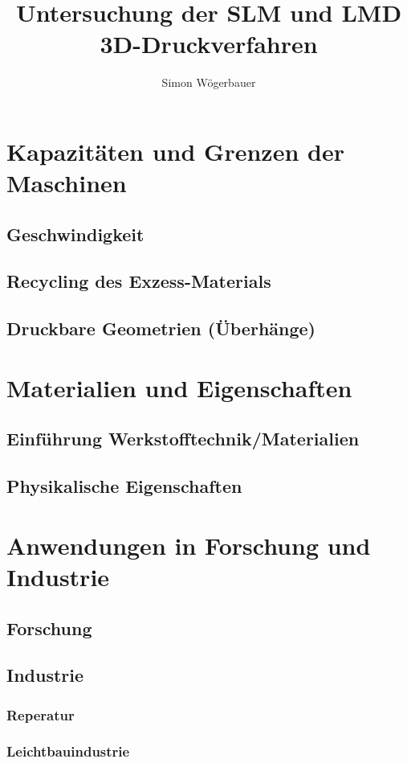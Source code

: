 \documentclass[12pt]{article}
\title{Untersuchung der SLM und LMD 3D-Druckverfahren}
\author{Simon Wögerbauer}
\begin{document}

%
\pagebreak
\pagebreak
{}
\tableofcontents
\pagebreak



\section{Kapazitäten und Grenzen der Maschinen}
\subsection{Geschwindigkeit}
\subsection{Recycling des Exzess-Materials}
\subsection{Druckbare Geometrien (Überhänge)}
\section{Materialien und Eigenschaften}
\subsection{Einführung Werkstofftechnik/Materialien}
\subsection{Physikalische Eigenschaften}

\section{Anwendungen in Forschung und Industrie}
\subsection{Forschung}
\subsection{Industrie}
\subsubsection{Reperatur}
\subsubsection{Leichtbauindustrie}
\pagebreak
\pagebreak
\printnoidxglossary[type=\acronymtype]
\printnoidxglossary
\pagebreak
\printbibliography
\pagebreak
\listoffigures
\end{document}
